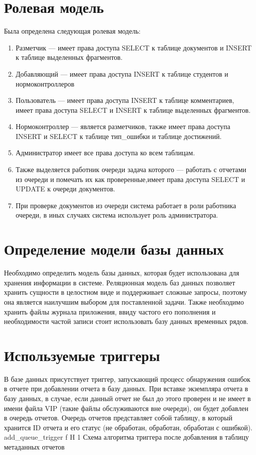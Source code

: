 \section{Ролевая модель}
Была определена следующая ролевая модель:
\begin{enumerate}
	\item Разметчик --- имеет права доступа SELECT к таблице документов и INSERT к таблице выделенных фрагментов.
	\item Добавляющий --- имеет права доступа INSERT к таблице студентов и нормоконтроллеров
	\item Пользователь --- имеет права доступа INSERT к таблице комментариев, имеет права доступа SELECT  и INSERT к таблице выделенных фрагментов.
	\item Нормоконтроллер --- является разметчиков, также имеет права доступа INSERT и SELECT к таблице тип\_ошибки и таблице достижений.
	\item Администратор имеет все права доступа ко всем таблицам.
	\item Также выделяется работник очереди задача которого --- работать с отчетами из очереди и помечать их как проверенные,имеет права доступа SELECT и UPDATE к очереди документов.
	\item При проверке документов из очереди система работает в роли работника очереди, в иных случаях система использует роль администратора.
\end{enumerate}

\section{Определение модели базы данных}
Необходимо определить модель базы данных, которая будет использована для хранения информации в системе. Реляционная модель баз данных позволяет хранить сущности в целостном виде и поддерживает сложные запросы, поэтому она является наилучшим выбором для поставленной задачи. Также необходимо хранить файлы журнала приложения, ввиду частого его пополнения и необходимости частой записи стоит использовать базу данных временных рядов.

\section{Используемые триггеры}
В базе данных присутствует триггер, запускающий процесс обнаружения ошибок в отчете при добавлении отчета в базу данных. При вставке экземпляра отчета в базу данных, в случае, если данный отчет не был до этого проверен и не имеет в имени файла VIP (такие файлы обслуживаются вне очереди), он будет добавлен в очередь отчетов. Очередь отчетов представляет собой таблицу, в который хранится ID отчета и его статус (не обработан, обработан, обработан с ошибкой).
{add_queue_trigger} %
{f} %
{H} %
{1\textwidth} %
{Схема алгоритма триггера после добавления в таблицу метаданных отчетов} %







